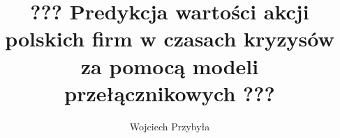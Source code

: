 \usepackage{config/uepThesis}
\usepackage{config/uepTitle}
	\title{??? Predykcja wartości akcji polskich firm w czasach kryzysów za pomocą modeli przełącznikowych ???}
	\author{Wojciech Przybyła}

\usepackage{booktabs}
\pagestyle{headings}
\usepackage{fancyhdr} 
\usepackage{color}
\usepackage{polski}
\usepackage{float}
  \makeatletter
	\renewcommand{\slimits@}{\limits} %
	\renewcommand{\nmlimits@}{\limits}
	\makeatother
	\renewcommand{\le}{\leqslant} %
	\renewcommand{\ge}{\geqslant}
\usepackage[nottoc]{tocbibind}

\usepackage{setspace}
\setlength\parindent{0.5cm}
\setlength{\headheight}{15pt}

\newcommand{\doubleC}{\mathbb{C}}
\newcommand{\doubleE}{\mathbb{E}}
\newcommand{\doubleK}{\mathbb{K}}
\newcommand{\doubleN}{\mathbb{N}}
\newcommand{\doubleP}{\mathbb{P}}
\newcommand{\doubleQ}{\mathbb{Q}}
\newcommand{\doubleR}{\mathbb{R}}
\newcommand{\doubleS}{\mathbb{S}}
\newcommand{\doubleZ}{\mathbb{Z}}
\newcommand{\scriptC}{\mathcal{C}}
\DeclareMathOperator{\tr}{tr}
\DeclareMathOperator{\Var}{Var}
\DeclareMathOperator{\Cov}{Cov}
\newcommand{\nz}[1]{\left( #1 \right)} %
\newcommand{\nk}[1]{\left[ #1 \right]} %
\newcommand{\set}[1]{\left\{ #1 \right\}}
\newcommand{\abs}[1]{\left| #1 \right|}
\newcommand{\norm}[1]{\left\| #1 \right\|}
\newcommand{\floor}[1]{\left\lfloor #1 \right\rfloor}
\newcommand{\ceil}[1]{\left\lceil #1 \right\rceil}
\newcommand{\A}[1]{\bigwedge_{#1}}
\newcommand{\E}[1]{\bigvee_{#1}}
\newcommand{\pcg}{\quad\Rightarrow\quad}%
\newcommand{\pcgc}{\quad&\Rightarrow\quad}%
\newcommand{\pcgk}{\Rightarrow}%
\newcommand{\pcgd}{\quad\Longrightarrow\quad}%
\newcommand{\xpcg}[1]{\overset{#1}{\pcg}}%
\newcommand{\wtw}{\quad\Leftrightarrow\quad}%
\newcommand{\wtwc}{\quad&\Leftrightarrow\quad}
\newcommand{\wtwk}{\Leftrightarrow}
\newcommand{\wtwd}{\Longleftrightarrow}
\newcommand{\xwtw}[1]{\overset{#1}{\wtw}}
\newcommand{\lwtw}{\leftrightarrow}%
\makeatletter
\newcommand{\xto}[2][]{\ext@arrow 0099\rightarrowfill@{#1}{#2}}
\makeatother
\newcommand{\bbar}[1]{\overline{\overline{#1}}}
\newcommand{\whichis}[2]{\underbrace{#2}_{#1}}
\newcommand{\oo}{\infty}


